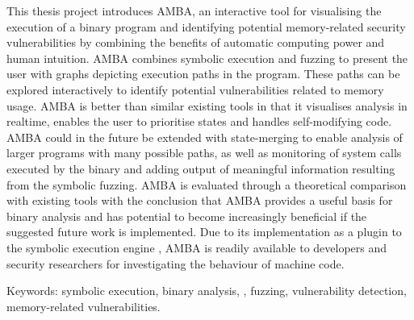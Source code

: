 This thesis project introduces AMBA, an interactive tool for
visualising the execution of a binary program and identifying
potential memory-related security vulnerabilities by combining the
benefits of automatic computing power and human intuition. AMBA
combines symbolic execution and fuzzing to present the user with
graphs depicting execution paths in the program. These paths can be
explored interactively to identify potential vulnerabilities related
to memory usage. AMBA is better than similar existing tools in that it
visualises analysis in realtime, enables the user to prioritise states
and handles self-modifying code. AMBA could in the future be extended
with state-merging to enable analysis of larger programs with many
possible paths, as well as monitoring of system calls executed by the
binary and adding output of meaningful information resulting from the
symbolic fuzzing. AMBA is evaluated through a theoretical comparison
with existing tools with the conclusion that AMBA provides a useful
basis for binary analysis and has potential to become increasingly
beneficial if the suggested future work is implemented. Due to its
implementation as a plugin to the symbolic execution engine \stoe{}, AMBA
is readily available to developers and security researchers for
investigating the behaviour of machine code.


Keywords: symbolic execution, binary analysis, \stoe{},
fuzzing, vulnerability detection, memory-related vulnerabilities.
